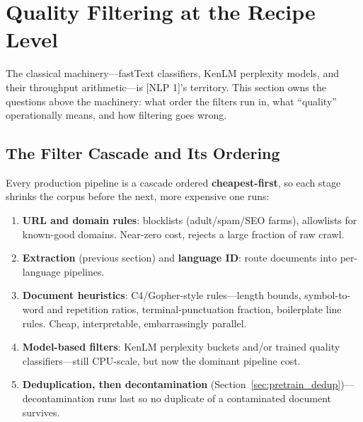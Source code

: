 \section{Quality Filtering at the Recipe Level}
\label{sec:pretrain_filtering}

The classical machinery---fastText classifiers, KenLM perplexity models, and their throughput arithmetic---is [NLP 1]'s territory. This section owns the questions above the machinery: what order the filters run in, what ``quality'' operationally means, and how filtering goes wrong.

\subsection{The Filter Cascade and Its Ordering}

Every production pipeline is a cascade ordered \textbf{cheapest-first}, so each stage shrinks the corpus before the next, more expensive one runs:

\begin{enumerate}
    \item \textbf{URL and domain rules}: blocklists (adult/spam/SEO farms), allowlists for known-good domains. Near-zero cost, rejects a large fraction of raw crawl.
    \item \textbf{Extraction} (previous section) and \textbf{language ID}: route documents into per-language pipelines.
    \item \textbf{Document heuristics}: C4/Gopher-style rules---length bounds, symbol-to-word and repetition ratios, terminal-punctuation fraction, boilerplate line rules. Cheap, interpretable, embarrassingly parallel.
    \item \textbf{Model-based filters}: KenLM perplexity buckets and/or trained quality classifiers---still CPU-scale, but now the dominant pipeline cost.
    \item \textbf{Deduplication, then decontamination} (Section~\ref{sec:pretrain_dedup})---decontamination runs last so no duplicate of a contaminated document survives.
\end{enumerate}

